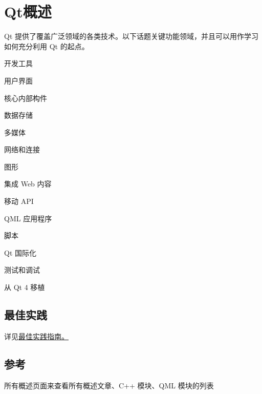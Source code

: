 \chapter{Qt概述}

Qt 提供了覆盖广泛领域的各类技术。以下话题关键功能领域，并且可以用作学习如何充分利用 Qt 的起点。

\begin{compactitem}[\arr]
\item 开发工具
\item 用户界面
\item 核心内部构件
\item 数据存储
\item 多媒体
\item 网络和连接
\item 图形
\item 集成 Web 内容
\item 移动 API
\item QML 应用程序
\item 脚本
\item Qt 国际化
\item 测试和调试
\item 从 Qt 4 移植
\end{compactitem}


\section{最佳实践}

详见\href{https://gitee.com/wcc210/QtDocumentCN/blob/master/Src/B/Best_Practice_Guides/Best_Practice_Guides.md}{最佳实践指南。}


\section{参考}

\begin{seeAlso}
所有概述页面来查看所有概述文章、C++ 模块、QML 模块的列表
\end{seeAlso}

